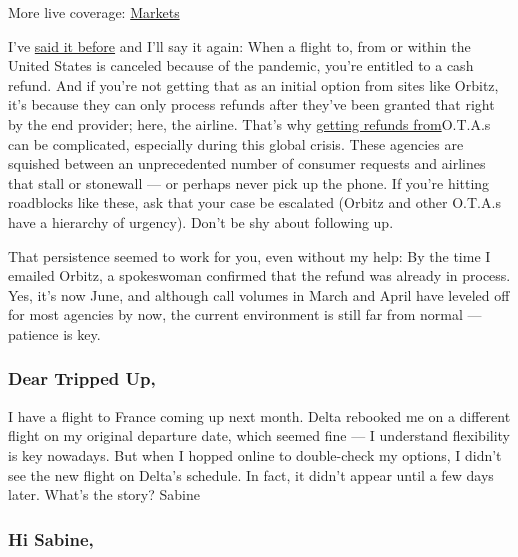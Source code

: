 More live coverage:
\href{https://www.nytimes3xbfgragh.onion/live/2020/08/21/business/stock-market-today-coronavirus?action=click\&pgtype=Article\&state=default\&region=MAIN_CONTENT_1\&context=storylines_live_updates}{Markets}

I've
\href{https://www.nytimes3xbfgragh.onion/2020/05/01/travel/trip-refund-airlines.html}{said
it before} and I'll say it again: When a flight to, from or within the
United States is canceled because of the pandemic, you're entitled to a
cash refund. And if you're not getting that as an initial option from
sites like Orbitz, it's because they can only process refunds after
they've been granted that right by the end provider; here, the airline.
That's why
\href{https://www.nytimes3xbfgragh.onion/2020/04/03/travel/coronavirus-refund-travel-ota.html?smtyp=cur\&smid=tw-nytimestravelhttps://www.nytimes3xbfgragh.onion/2020/04/03/travel/coronavirus-refund-travel-ota.html}{getting
refunds from}O.T.A.s can be complicated, especially during this global
crisis. These agencies are squished between an unprecedented number of
consumer requests and airlines that stall or stonewall --- or perhaps
never pick up the phone. If you're hitting roadblocks like these, ask
that your case be escalated (Orbitz and other O.T.A.s have a hierarchy
of urgency). Don't be shy about following up.

That persistence seemed to work for you, even without my help: By the
time I emailed Orbitz, a spokeswoman confirmed that the refund was
already in process. Yes, it's now June, and although call volumes in
March and April have leveled off for most agencies by now, the current
environment is still far from normal --- patience is key.

\hypertarget{dear-tripped-up-1}{%
\subsubsection{\texorpdfstring{\textbf{Dear Tripped
Up,}}{Dear Tripped Up,}}\label{dear-tripped-up-1}}

I have a flight to France coming up next month. Delta rebooked me on a
different flight on my original departure date, which seemed fine --- I
understand flexibility is key nowadays. But when I hopped online to
double-check my options, I didn't see the new flight on Delta's
schedule. In fact, it didn't appear until a few days later. What's the
story? Sabine

\hypertarget{hi-sabine}{%
\subsubsection{Hi Sabine,}\label{hi-sabine}}

